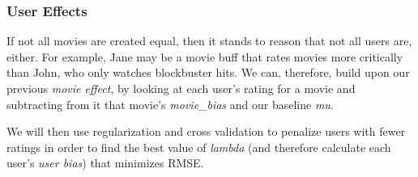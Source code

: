 \documentclass[
]{article}
\newenvironment{Shaded}{\begin{snugshade}}{\end{snugshade}}
\newcommand{\DataTypeTok}[1]{\textcolor[rgb]{0.13,0.29,0.53}{#1}}
\newcommand{\DecValTok}[1]{\textcolor[rgb]{0.00,0.00,0.81}{#1}}
\newcommand{\KeywordTok}[1]{\textcolor[rgb]{0.13,0.29,0.53}{\textbf{#1}}}
\newcommand{\NormalTok}[1]{#1}
\newcommand{\OperatorTok}[1]{\textcolor[rgb]{0.81,0.36,0.00}{\textbf{#1}}}
\newcommand{\StringTok}[1]{\textcolor[rgb]{0.31,0.60,0.02}{#1}}
\begin{document}
\hypertarget{user-effects}{%
\subsubsection{User Effects}\label{user-effects}}

If not all movies are created equal, then it stands to reason that not
all users are, either. For example, Jane may be a movie buff that rates
movies more critically than John, who only watches blockbuster hits. We
can, therefore, build upon our previous \emph{movie effect}, by looking
at each user's rating for a movie and subtracting from it that movie's
\emph{movie\_bias} and our baseline \emph{mu}.

We will then use regularization and cross validation to penalize users
with fewer ratings in order to find the best value of \emph{lambda} (and
therefore calculate each user's \emph{user bias}) that minimizes RMSE.

\begin{Shaded}
\end{Shaded}
\end{document}
